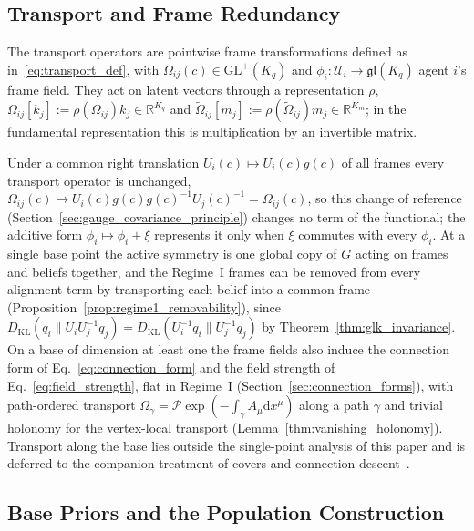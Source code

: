 \documentclass[11pt]{article}
\begin{document}
\subsection{Transport and Frame Redundancy}
\label{sec:gauge_transport_arbitrary}

The transport operators are pointwise frame transformations defined as in~\eqref{eq:transport_def}, with $\Omega_{ij}(c) \in \mathrm{GL}^+(K_q)$ and $\phi_i: \mathcal{U}_i \to \mathfrak{gl}(K_q)$ agent $i$'s frame field. They act on latent vectors through a representation $\rho$, $\Omega_{ij}[k_j] := \rho(\Omega_{ij}) k_j \in \mathbb{R}^{K_q}$ and $\tilde{\Omega}_{ij}[m_j] := \rho(\tilde{\Omega}_{ij}) m_j \in \mathbb{R}^{K_m}$; in the fundamental representation this is multiplication by an invertible matrix.

Under a common right translation $U_i(c) \mapsto U_i(c) g(c)$ of all frames every transport operator is unchanged, $\Omega_{ij}(c) \mapsto U_i(c) g(c) g(c)^{-1} U_j(c)^{-1} = \Omega_{ij}(c)$, so this change of reference (Section~\ref{sec:gauge_covariance_principle}) changes no term of the functional; the additive form $\phi_i \mapsto \phi_i + \xi$ represents it only when $\xi$ commutes with every $\phi_i$. At a single base point the active symmetry is one global copy of $G$ acting on frames and beliefs together, and the Regime~I frames can be removed from every alignment term by transporting each belief into a common frame (Proposition~\ref{prop:regime1_removability}), since $D_{\mathrm{KL}}(q_i \| U_iU_j^{-1}q_j) = D_{\mathrm{KL}}(U_i^{-1}q_i \| U_j^{-1}q_j)$ by Theorem~\ref{thm:glk_invariance}. On a base of dimension at least one the frame fields also induce the connection form of Eq.~\eqref{eq:connection_form} and the field strength of Eq.~\eqref{eq:field_strength}, flat in Regime~I (Section~\ref{sec:connection_forms}), with path-ordered transport $\Omega_\gamma = \mathcal{P}\exp(-\int_\gamma A_\mu \mathrm{d}x^\mu)$ along a path $\gamma$ and trivial holonomy for the vertex-local transport (Lemma~\ref{thm:vanishing_holonomy}). Transport along the base lies outside the single-point analysis of this paper and is deferred to the companion treatment of covers and connection descent~\cite[Ch.~B4]{DennisGaugeVFESuppB2026}.

\subsection{Base Priors and the Population Construction}
\end{document}

